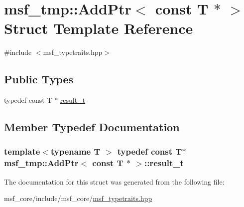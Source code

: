 \hypertarget{structmsf__tmp_1_1AddPtr_3_01const_01T_01_5_01_4}{\section{msf\-\_\-tmp\-:\-:Add\-Ptr$<$ const T $\ast$ $>$ Struct Template Reference}
\label{structmsf__tmp_1_1AddPtr_3_01const_01T_01_5_01_4}
}


{\ttfamily \#include $<$msf\-\_\-typetraits.\-hpp$>$}

\subsection*{Public Types}
\begin{DoxyCompactItemize}
\item 
typedef const T $\ast$ \hyperlink{structmsf__tmp_1_1AddPtr_3_01const_01T_01_5_01_4_a826780f33bde2bbf4c5df2e74b3e4c88}{result\-\_\-t}
\end{DoxyCompactItemize}


\subsection{Member Typedef Documentation}
\hypertarget{structmsf__tmp_1_1AddPtr_3_01const_01T_01_5_01_4_a826780f33bde2bbf4c5df2e74b3e4c88}{
\subsubsection[{result\-\_\-t}]{\setlength{\rightskip}{0pt plus 5cm}template$<$typename T $>$ typedef const T$\ast$ {\bf msf\-\_\-tmp\-::\-Add\-Ptr}$<$ const T $\ast$ $>$\-::{\bf result\-\_\-t}}}\label{structmsf__tmp_1_1AddPtr_3_01const_01T_01_5_01_4_a826780f33bde2bbf4c5df2e74b3e4c88}


The documentation for this struct was generated from the following file\-:\begin{DoxyCompactItemize}
\item 
msf\-\_\-core/include/msf\-\_\-core/\hyperlink{msf__typetraits_8hpp}{msf\-\_\-typetraits.\-hpp}\end{DoxyCompactItemize}
